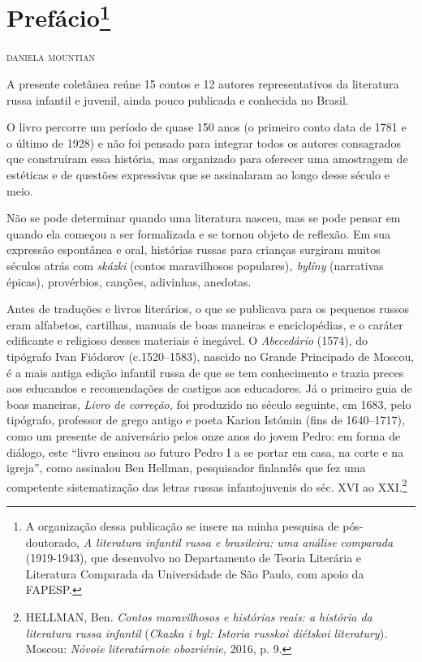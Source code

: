 \chapter{Prefácio\footnote{A
  organização dessa publicação se insere na minha pesquisa de
  pós-doutorado, \emph{A literatura infantil russa e brasileira: uma
  análise comparada} (1919-1943), que desenvolvo no Departamento
  de Teoria Literária e Literatura Comparada da Universidade de São
  Paulo, com apoio da FAPESP.}}

\begin{flushright}
\hfill\textsc{daniela mountian}
\end{flushright}

A presente coletânea reúne 15 contos e 12 autores representativos da
literatura russa infantil e juvenil, ainda pouco publicada e conhecida
no Brasil.

O livro percorre um período de quase 150 anos (o primeiro conto data de
1781 e o último de 1928) e não foi pensado para integrar todos os
autores consagrados que construíram essa história, mas organizado para
oferecer uma amostragem de estéticas e de questões expressivas que se
assinalaram ao longo desse século e meio.

Não se pode determinar quando uma literatura nasceu, mas se pode pensar
em quando ela começou a ser formalizada e se tornou objeto de reflexão.
Em sua expressão espontânea e oral, histórias russas para crianças
surgiram muitos séculos atrás com \emph{skázki} (contos maravilhosos
populares)\emph{, bylíny} (narrativas épicas)\emph{,} provérbios,
canções, adivinhas, anedotas.

Antes de traduções e livros literários, o que se publicava para os
pequenos russos eram alfabetos, cartilhas, manuais de boas maneiras e
enciclopédias, e o caráter edificante e religioso desses materiais é
inegável. O \emph{Abecedário} (1574), do tipógrafo Ivan Fiódorov
(c.1520--1583), nascido no Grande Principado de Moscou, é a mais antiga
edição infantil russa de que se tem conhecimento e trazia preces aos
educandos e recomendações de castigos aos educadores. Já o primeiro guia
de boas maneiras, \emph{Livro de correção,} foi produzido no século
seguinte, em 1683, pelo tipógrafo, professor de grego antigo e poeta
Karion Istómin (fins de 1640--1717), como um presente de aniversário
pelos onze anos do jovem Pedro: em forma de diálogo, este ``livro
ensinou ao futuro Pedro I a se portar em casa, na corte e na igreja'',
como assinalou Ben Hellman, pesquisador finlandês que fez uma competente
sistematização das letras russas infantojuvenis do séc. XVI ao
XXI.\footnote{HELLMAN, Ben. \emph{Contos maravilhosos e histórias reais:
  a história da literatura russa infantil} (\emph{Ckazka i byl: Istoria
  russkoi diétskoi literatury})\emph{.} Moscou: \emph{Nóvoie
  literatúrnoie obozriénie,} 2016, p. 9.}

